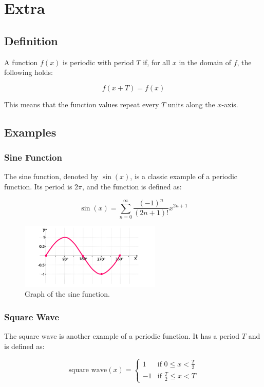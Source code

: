\documentclass[12pt,a4paper]{article}
\begin{document}
\newpage
\section*{Extra}
\subsection*{Definition}

A function $f(x)$ is periodic with period $T$ if, for all $x$ in the domain of $f$, the following holds:

\[
f(x + T) = f(x)
\]

This means that the function values repeat every $T$ units along the $x$-axis.

\subsection*{Examples}

\subsubsection*{Sine Function}

\begin{tcolorbox}[mybox]
    The sine function, denoted by $\sin(x)$, is a classic example of a periodic function. Its period is $2\pi$, and the function is defined as:
    
    \[
    \sin(x) = \sum_{n=0}^{\infty} \frac{(-1)^n}{(2n+1)!} x^{2n+1}
    \]
\end{tcolorbox}

\begin{figure}[h]
    \centering
    \includegraphics[width=0.6\textwidth]{Unit 6/Sine-Graph.png}
    \caption{Graph of the sine function.}
\end{figure}
\newpage 
\subsubsection*{Square Wave}

\begin{tcolorbox}[mybox]
    The square wave is another example of a periodic function. It has a period $T$ and is defined as:
    
    \[
    \text{square wave}(x) = 
    \begin{cases} 
    1 & \text{if } 0 \leq x < \frac{T}{2} \\
    -1 & \text{if } \frac{T}{2} \leq x < T
    \end{cases}
    \]
\end{tcolorbox}
\end{document}
